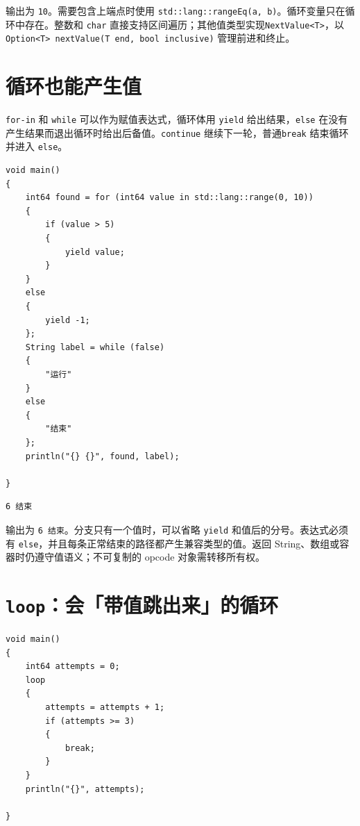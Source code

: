 输出为 \texttt{10}。需要包含上端点时使用 \texttt{std:\allowbreak{}:\allowbreak{}lang:\allowbreak{}:\allowbreak{}range\allowbreak{}Eq(\allowbreak{}a,\allowbreak{} b)\allowbreak{}}。循环变量只在循环中存在。整数和 \texttt{char} 直接支持区间遍历；其他值类型实现\texttt{Next\allowbreak{}Value<\allowbreak{}T>\allowbreak{}}，以 \texttt{Option<\allowbreak{}T>\allowbreak{} next\allowbreak{}Value(\allowbreak{}T end,\allowbreak{} bool inclusive)\allowbreak{}} 管理前进和终止。

\section{循环也能产生值}

\texttt{for-in} 和 \texttt{while} 可以作为赋值表达式，循环体用 \texttt{yield} 给出结果，\texttt{else} 在没有产生结果而退出循环时给出后备值。\texttt{continue} 继续下一轮，普通\texttt{break} 结束循环并进入 \texttt{else}。

\par
\medskip
\begin{lstlisting}[style=chali]
void main()
{
    int64 found = for (int64 value in std::lang::range(0, 10))
    {
        if (value > 5)
        {
            yield value;
        }
    }
    else
    {
        yield -1;
    };
    String label = while (false)
    {
        "运行"
    }
    else
    {
        "结束"
    };
    println("{} {}", found, label);

}
\end{lstlisting}
\par
\medskip

\par
\medskip
\begin{lstlisting}[style=out]
6 结束
\end{lstlisting}
\par
\medskip

输出为 \texttt{6 结束}。分支只有一个值时，可以省略 \texttt{yield} 和值后的分号。表达式必须有 \texttt{else}，并且每条正常结束的路径都产生兼容类型的值。返回 String、数组或容器时仍遵守值语义；不可复制的 opcode 对象需转移所有权。

\section{\texttt{loop}：会「带值跳出来」的循环}

\par
\medskip
\begin{lstlisting}[style=chali]
void main()
{
    int64 attempts = 0;
    loop
    {
        attempts = attempts + 1;
        if (attempts >= 3)
        {
            break;
        }
    }
    println("{}", attempts);

}
\end{lstlisting}
\par
\medskip

